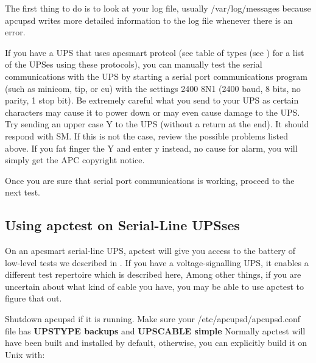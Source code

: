 {{{{{{{{{\begin{itemize}
\begin{verbatim}
\end{verbatim}
\normalsize

\end{itemize}

The first thing to do is to look at your log file, usually /var/log/messages
because apcupsd writes more detailed information to the log file whenever
there is an error.  

If you have a UPS that uses apcsmart protcol (see table of types (see 
) for a list of the UPSes using
these protocols), you can manually test the serial communications with the UPS
by starting a serial port communications program (such as minicom, tip, or cu)
with the settings 2400 8N1 (2400 baud, 8 bits, no parity, 1 stop bit). Be
extremely careful what you send to your UPS as certain characters may cause it
to power down or may even cause damage to the UPS. Try sending an upper case Y
to the UPS (without a return at the end). It should respond with SM. If this
is not the case, review the possible problems listed above. If you fat finger
the Y and enter y instead, no cause for alarm, you will simply get the APC
copyright notice.  

Once you are sure that serial port communications is working, proceed to the
next test. 

\label{Using-apctest-on-Serial_002dLine-UPSses}

\subsection*{Using apctest on Serial-Line UPSses}

\label{index-apctest-222}
\label{index-Testing_002c-with-apctest-223}
On an apcsmart serial-line UPS, apctest will give you access to the battery of
low-level tests we described in 
.  If you have a voltage-signalling UPS, it
enables a different test repertoire which is described here, Among other
things, if you are uncertain about what kind of cable you have, you may be
able to use apctest to figure that out.  

Shutdown apcupsd if it is running. Make sure your /etc/apcupsd/apcupsd.conf
file has {\bf UPSTYPE backups} and {\bf UPSCABLE simple} Normally apctest will
have been built and installed by default, otherwise, you can explicitly build
it on Unix with: 

}}}}}}}}}
